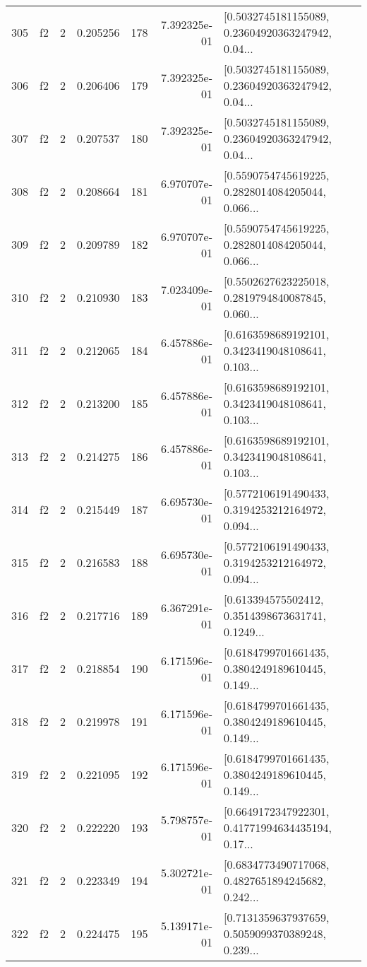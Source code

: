 \begin{tabular}{lllrlrl}
305 &  f2 &   2 &  0.205256 &  178 &  7.392325e-01 &  [0.5032745181155089, 0.23604920363247942, 0.04... \\
306 &  f2 &   2 &  0.206406 &  179 &  7.392325e-01 &  [0.5032745181155089, 0.23604920363247942, 0.04... \\
307 &  f2 &   2 &  0.207537 &  180 &  7.392325e-01 &  [0.5032745181155089, 0.23604920363247942, 0.04... \\
308 &  f2 &   2 &  0.208664 &  181 &  6.970707e-01 &  [0.5590754745619225, 0.2828014084205044, 0.066... \\
309 &  f2 &   2 &  0.209789 &  182 &  6.970707e-01 &  [0.5590754745619225, 0.2828014084205044, 0.066... \\
310 &  f2 &   2 &  0.210930 &  183 &  7.023409e-01 &  [0.5502627623225018, 0.2819794840087845, 0.060... \\
311 &  f2 &   2 &  0.212065 &  184 &  6.457886e-01 &  [0.6163598689192101, 0.3423419048108641, 0.103... \\
312 &  f2 &   2 &  0.213200 &  185 &  6.457886e-01 &  [0.6163598689192101, 0.3423419048108641, 0.103... \\
313 &  f2 &   2 &  0.214275 &  186 &  6.457886e-01 &  [0.6163598689192101, 0.3423419048108641, 0.103... \\
314 &  f2 &   2 &  0.215449 &  187 &  6.695730e-01 &  [0.5772106191490433, 0.3194253212164972, 0.094... \\
315 &  f2 &   2 &  0.216583 &  188 &  6.695730e-01 &  [0.5772106191490433, 0.3194253212164972, 0.094... \\
316 &  f2 &   2 &  0.217716 &  189 &  6.367291e-01 &  [0.613394575502412, 0.3514398673631741, 0.1249... \\
317 &  f2 &   2 &  0.218854 &  190 &  6.171596e-01 &  [0.6184799701661435, 0.3804249189610445, 0.149... \\
318 &  f2 &   2 &  0.219978 &  191 &  6.171596e-01 &  [0.6184799701661435, 0.3804249189610445, 0.149... \\
319 &  f2 &   2 &  0.221095 &  192 &  6.171596e-01 &  [0.6184799701661435, 0.3804249189610445, 0.149... \\
320 &  f2 &   2 &  0.222220 &  193 &  5.798757e-01 &  [0.6649172347922301, 0.41771994634435194, 0.17... \\
321 &  f2 &   2 &  0.223349 &  194 &  5.302721e-01 &  [0.6834773490717068, 0.4827651894245682, 0.242... \\
322 &  f2 &   2 &  0.224475 &  195 &  5.139171e-01 &  [0.7131359637937659, 0.5059099370389248, 0.239... \\

\end{tabular}

